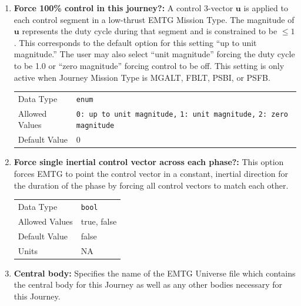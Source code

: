 \begin{enumerate}
    \item \textbf{Force 100\% control in this journey?:} A control 3-vector $\mathbf{u}$ is applied to each control segment in a low-thrust \ac{EMTG} Mission Type. The magnitude of $\mathbf{u}$ represents the duty cycle during that segment and is constrained to be $\leq 1$. This corresponds to the default option for this setting ``up to unit magnitude.'' The user may also select ``unit magnitude'' forcing the duty cycle to be 1.0 or ``zero magnitude'' forcing control to be off. This setting is only active when Journey Mission Type is \ac{MGALT}, \ac{FBLT}, \ac{PSBI}, or \ac{PSFB}.
    
        \begin{table}[H]
            \hspace{2cm}
            \begin{tabular}{lp{3cm}}
            Data Type & \verb|enum | \\
            Allowed Values & 
            \verb|0: up to unit magnitude,|\newline
            \verb|1: unit magnitude,|\newline 
            \verb|2: zero magnitude|  \\
            Default Value & 0 \\
            \end{tabular}
        \end{table}

    \item \textbf{Force single inertial control vector across each phase?:} This option forces \ac{EMTG} to point the control vector in a constant, inertial direction for the duration of the phase by forcing all control vectors to match each other.

        \begin{table}[H]
            \hspace{2cm}
            \begin{tabular}{ll}
            Data Type & \verb|bool| \\
            Allowed Values & true, false \\
            Default Value & false \\
            Units & NA
            \end{tabular}
        \end{table}


    \item \textbf{Central body:} Specifies the name of the \ac{EMTG} Universe file which contains the central body for this Journey as well as any other bodies necessary for this Journey.
    

\end{enumerate}
